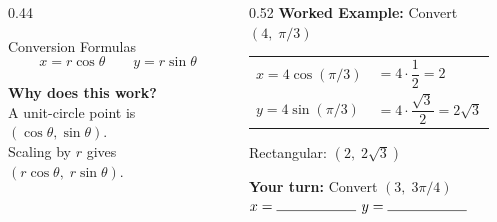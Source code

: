 \documentclass[aspectratio=169, 11pt]{beamer}
\begin{document}
\begin{frame}[t, plain]

  \begin{columns}[T]
    \begin{column}{0.44\textwidth}
      \begin{block}{Conversion Formulas}
        \[ x = r\cos\theta \qquad y = r\sin\theta \]
      \end{block}

      \vspace{0.3cm}
      \textbf{Why does this work?}\\
      A unit-circle point is $(\cos\theta,\sin\theta)$.\\
      Scaling by $r$ gives $(r\cos\theta,\; r\sin\theta)$.
    \end{column}

    \begin{column}{0.52\textwidth}
      \textbf{Worked Example:} Convert $(4,\; \pi/3)$

      \vspace{0.2cm}
      \begin{tabular}{ll}
        $x = 4\cos(\pi/3)$ & $= 4 \cdot \dfrac{1}{2} = 2$ \\[8pt]
        $y = 4\sin(\pi/3)$ & $= 4 \cdot \dfrac{\sqrt{3}}{2} = 2\sqrt{3}$ \\
      \end{tabular}

      \vspace{0.3cm}
      Rectangular: $(2,\; 2\sqrt{3})$

      \vspace{0.4cm}
      \textbf{Your turn:} Convert $(3,\; 3\pi/4)$\\[4pt]
      $x = \rule{2cm}{0.4pt}$ \qquad $y = \rule{2cm}{0.4pt}$
    \end{column}
  \end{columns}
\end{frame}
\end{document}

